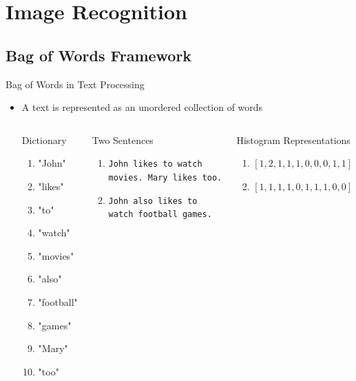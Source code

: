 \section{Image Recognition}

\subsection{Bag of Words Framework}
\begin{frame}{Bag of Words in Text Processing}
	\begin{itemize}
		\item A text is represented as an unordered collection of words

		\begin{columns}

				\begin{block}{Dictionary}

					\begin{enumerate}
					  \item  \footnotesize{"John"}
					  \item  \footnotesize{"likes"}
					  \item  \footnotesize{"to"}
					  \item  \footnotesize{"watch"}
					  \item  \footnotesize{"movies"}
					  \item  \footnotesize{"also"}
					  \item  \footnotesize{"football"}
					  \item  \footnotesize{"games"}
					  \item  \footnotesize{"Mary"}
					  \item  \footnotesize{"too"}
					 \end{enumerate}
					
				\end{block}


				\begin{block}{Two Sentences}
					\begin{enumerate}
						\item \texttt{John likes to watch movies. Mary likes too.}
						\item \texttt{John also likes to watch football games.}
					\end{enumerate}
				\end{block}

				\begin{block}{Histogram Representations}
					\begin{enumerate}
						\item $[1, 2, 1, 1, 1, 0, 0, 0, 1, 1]$
						\item $[1, 1, 1, 1, 0, 1, 1, 1, 0, 0]$
					\end{enumerate}
				\end{block}
		\end{columns}
	\end{itemize}

\end{frame}

